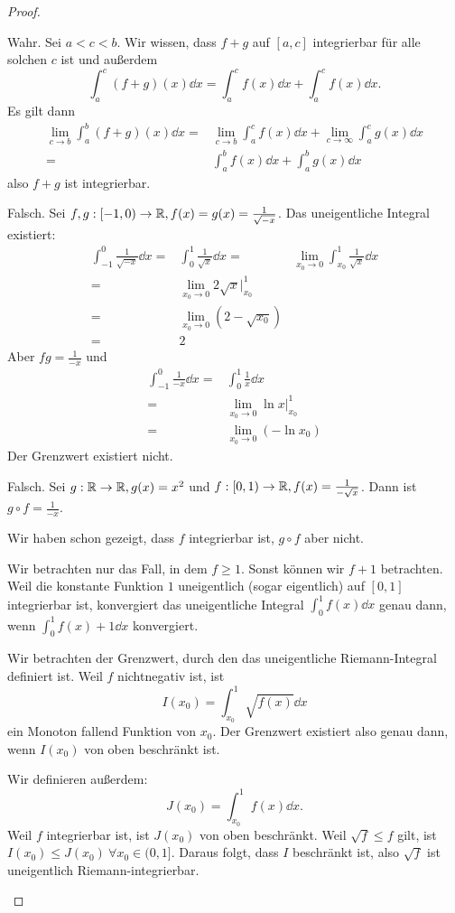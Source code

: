 \begin{proof}
	\begin{parts}
	\item Wahr. Sei $a<c<b$. Wir wissen, dass $f+g$ auf $[a,c]$ integrierbar f\"{u}r alle solchen $c $ ist und außerdem
		\[
			\int_a^c (f+g)(x)\dd{x}=\int_a^c f(x)\dd{x}+\int_a^c f(x)\dd{x}
		.\] 
		Es gilt dann
		\begin{align*}
			\lim_{c \to b} \int_a^b (f+g)(x)\dd{x}=&\lim_{c \to b} \int_a^c f(x)\dd{x}+\lim_{c \to \infty} \int_a^c g(x)\dd{x}\\
			=&\int_a^b f(x)\dd{x}+\int_a^b g(x)\dd{x}
		\end{align*}
		also $f+g$ ist integrierbar.
	\item Falsch. Sei $f,g:[-1,0)\to \mathbb{R}, f(x)=g(x)=\frac{1}{\sqrt{-x} }$. Das uneigentliche Integral existiert:
		\begin{align*}
			\int_{-1}^0 \frac{1}{\sqrt{-x} }\dd{x}=&\int_0^1 \frac{1}{\sqrt{x} }\dd{x}
			=&\lim_{x_0 \to 0}\int_{x_0}^1 \frac{1}{\sqrt{x} }\dd{x}\\
			=&\lim_{x_0 \to 0} 2\sqrt{x} |_{x_0}^1\\
			=&\lim_{x_0 \to 0} (2-\sqrt{x_0} )\\
			=&2
		\end{align*}
		Aber $fg=\frac{1}{-x}$ und
		\begin{align*}
			\int_{-1}^0 \frac{1}{-x}\dd{x}=& \int_0^1 \frac{1}{x}\dd{x}\\
			=&\lim_{x_0 \to 0} \ln x|_{x_0}^1\\
			=&\lim_{x_0 \to 0} (-\ln x_0)
		\end{align*}
		Der Grenzwert existiert nicht.
	\item Falsch. Sei $g:\mathbb{R}\to \mathbb{R}, g(x)=x^2$ und $f:[0,1)\to \mathbb{R}, f(x)=\frac{1}{-\sqrt{x} }$. Dann ist $g\circ f = \frac{1}{-x}$.

		Wir haben schon gezeigt, dass $f$ integrierbar ist, $g\circ f$ aber nicht.
	\item Wir betrachten nur das Fall, in dem $f\ge 1$. Sonst können wir $f+1$ betrachten. Weil die konstante Funktion $1$ uneigentlich (sogar eigentlich) auf $[0,1]$ integrierbar ist, konvergiert das uneigentliche Integral $\int_0^1 f(x)\dd{x}$ genau dann, wenn $\int_0^1 f(x)+1\dd{x}$ konvergiert.

		Wir betrachten der Grenzwert, durch den das uneigentliche Riemann-Integral definiert ist. Weil $f$ nichtnegativ ist, ist
		\[
			I(x_0)=\int_{x_0}^1 \sqrt{f(x)} \dd{x}
		\]
		ein Monoton fallend Funktion von $x_0$. Der Grenzwert existiert also genau dann, wenn $I(x_0)$ von oben beschränkt ist.

		Wir definieren außerdem:
		\[
			J(x_0)=\int_{x_0}^1 f(x)\dd{x}
		.\] 
		Weil $f$ integrierbar ist, ist $J(x_0)$ von oben beschränkt. Weil $\sqrt{f} \le f$ gilt, ist $I(x_0)\le J(x_0)~\forall x_0\in (0,1]$. Daraus folgt, dass $I$ beschränkt ist, also $\sqrt{f} $ ist uneigentlich Riemann-integrierbar.\qedhere
	\end{parts}
\end{proof}
